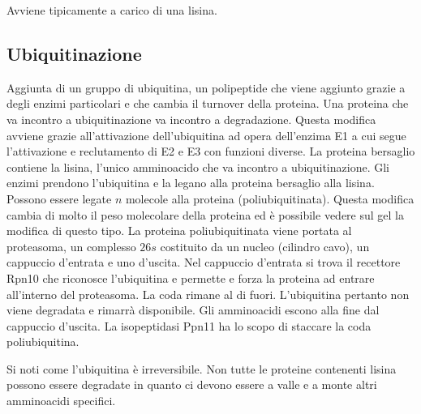 	Avviene tipicamente a carico di una lisina.

	\subsection{Ubiquitinazione}
	Aggiunta di un gruppo di ubiquitina, un polipeptide che viene aggiunto grazie a degli enzimi particolari e che cambia il turnover della proteina. 
Una proteina che va incontro a 
	ubiquitinazione va incontro a degradazione. 
Questa modifica avviene grazie all'attivazione dell'ubiquitina ad opera dell'enzima E1 a cui segue l'attivazione e reclutamento di E2 e E3 con
	funzioni diverse. 
La proteina bersaglio contiene la lisina, l'unico amminoacido che va incontro a ubiquitinazione. 
Gli enzimi prendono l'ubiquitina e la legano alla proteina bersaglio
	alla lisina. 
Possono essere legate $n$ molecole alla proteina (poliubiquitinata). 
Questa modifica cambia di molto il peso molecolare della proteina ed \`e possibile vedere sul gel la
	modifica di questo tipo. 
La proteina poliubiquitinata viene portata al proteasoma, un complesso $26s$ costituito da un nucleo (cilindro cavo), un cappuccio d'entrata e uno d'uscita. 
Nel
	cappuccio d'entrata si trova il recettore Rpn10 che riconosce l'ubiquitina e permette e forza la proteina ad entrare all'interno del proteasoma. 
La coda rimane al di fuori. 
L'ubiquitina 
	pertanto non viene degradata e rimarr\`a disponibile. 
Gli amminoacidi escono alla fine dal cappuccio d'uscita. 
La isopeptidasi Ppn11 ha lo scopo di staccare la coda poliubiquitina. 

	Si noti come l'ubiquitina \`e irreversibile. 
Non tutte le proteine contenenti lisina possono essere degradate in quanto ci devono essere a valle e a monte altri amminoacidi specifici. 


